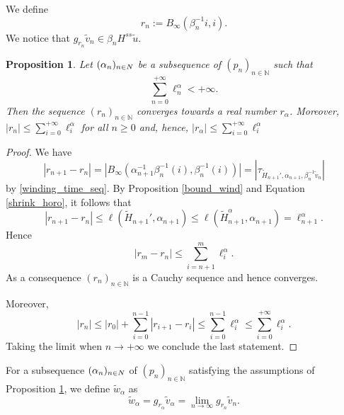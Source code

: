 \documentclass[a4paper,english,reqno]{amsart}
\newcommand{\N}{\mathbb{N}} %
\newtheorem{proposition}{Proposition}
\newtheorem{property}{Property} %
\theoremstyle{definition}
\numberwithin{equation}{section}
\begin{document}
We define \[
r_n := B_{\infty}(\beta_n^{-1} i , i ).
\]
We notice that $ g_{r_n} \tilde v_n \in \beta_n H^{ss} \tilde u$.

\begin{proposition}\label{convergence_winding_time}
	Let $(\alpha_n)_{n\in\\N}$ be a subsequence of $(p_n)_{n\in \N}$ such that \[ \sum_{n=0}^{+\infty} \ell_n^{\alpha} < +\infty.\] Then the sequence $(r_n)_{n\in \mathbb{N}}$ converges towards a real number $r_{\alpha}$. 
	Moreover, $|r_n|\le \sum_{i=0}^{+\infty} \ell_i^{\alpha}$ for all $n\ge 0$ and, hence, $|r_{\alpha}|\le \sum_{i=0}^{+\infty} \ell_i^{\alpha}$ 
\end{proposition}

\begin{proof}
	We have \[\left | r_{n+1}-r_n  \right |=\left | B_\infty(\alpha_{n+1}^{-1}\beta_n^{-1}(i), \beta_n^{-1}(i)) \right |  = |\tau_{\tilde H_{n+1}', \alpha_{n+1}, \beta_{n}^{-1}\tilde v_n} | \] by \ref{winding_time_seq}. By Proposition \ref{bound_wind} and Equation \ref{shrink_horo},
	it follows that
	$$
	\left | r_{n+1}-r_n  \right | \le  \ell(\tilde H_{n+1}', \alpha_{n+1})\leq \ell(\tilde H_{n+1}^{\alpha}, \alpha_{n+1}) = \ell^{\alpha}_{n+1}.$$
	Hence \[
	\left | r_{m}-r_n  \right |\le \sum_{i=n+1}^{m}\ell^{\alpha}_{i}.
	\]
	As a consequence $(r_n)_{n\in \N}$ is a Cauchy sequence and hence converges.
	
	Moreover, \[
	|r_n|\le |r_0| + \sum_{i=0}^{n-1} \left | r_{i+1}-r_i  \right | \le \sum_{i=0}^{n-1}\ell^{\alpha}_{i} \le  \sum_{i=0}^{+\infty}\ell^{\alpha}_{i}.
	\]
	Taking the limit when $n\to +\infty$ we conclude the last statement.
\end{proof}

For a subsequence $(\alpha_n)_{n\in\\N}$ of $(p_n)_{n\in \N}$ satisfying the assumptions of Proposition \ref{convergence_winding_time}, we define $\tilde w_\alpha$ as 
$$\tilde w_\alpha=g_{r_\alpha}\tilde v_\alpha=\lim\limits_{n\to \infty}g_{r_n}\tilde v_n.$$

\end{document}
